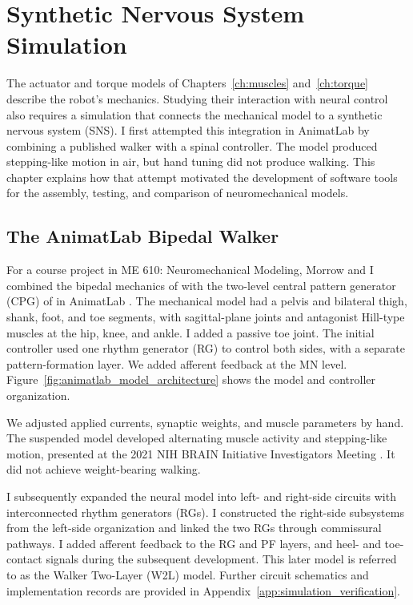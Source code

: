 \chapter{Synthetic Nervous System Simulation}\label{ch:sns}
\graphicspath{{figs/60-sns/}{figs/60-sns/AnimatLab_reference/}}

The actuator and torque models of Chapters~\ref{ch:muscles} and~\ref{ch:torque} describe the robot's mechanics. Studying their interaction with neural control also requires a simulation that connects the mechanical model to a synthetic nervous system (SNS). I first attempted this integration in AnimatLab by combining a published walker with a spinal controller. The model produced stepping-like motion in air, but hand tuning did not produce walking. This chapter explains how that attempt motivated the development of software tools for the assembly, testing, and comparison of neuromechanical models.

\section{The AnimatLab Bipedal Walker}\label{sec:prior_walker}

For a course project in ME 610: Neuromechanical Modeling, Morrow and I combined the bipedal mechanics of \citet{li_bipedal_2017} with the two-level central pattern generator (CPG) of \citet{deng_neuromechanical_2019} in AnimatLab \citep{cofer_animatlab_2010}. The mechanical model had a pelvis and bilateral thigh, shank, foot, and toe segments, with sagittal-plane joints and antagonist Hill-type muscles at the hip, knee, and ankle. I added a passive toe joint. The initial controller used one rhythm generator (RG) to control both sides, with a separate pattern-formation layer. We added afferent feedback at the MN level. Figure~\ref{fig:animatlab_model_architecture} shows the model and controller organization.

We adjusted applied currents, synaptic weights, and muscle parameters by hand. The suspended model developed alternating muscle activity and stepping-like motion, presented at the 2021 NIH BRAIN Initiative Investigators Meeting \citep{bolenTorqueValuesArtificialKnee2021June15-17}. It did not achieve weight-bearing walking.

I subsequently expanded the neural model into left- and right-side circuits with interconnected rhythm generators (RGs). I constructed the right-side subsystems from the left-side organization and linked the two RGs through commissural pathways. I added afferent feedback to the RG and PF layers, and heel- and toe-contact signals during the subsequent development. This later model is referred to as the Walker Two-Layer (W2L) model. Further circuit schematics and implementation records are provided in Appendix~\ref{app:simulation_verification}.

